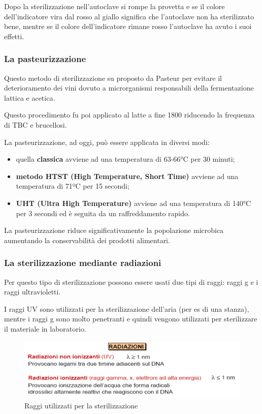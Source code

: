 \documentclass[11pt]{book}
\begin{document}
Dopo la sterilizzazione nell’autoclave si rompe la provetta e se il colore dell'indicatore vira dal rosso al giallo significa che l’autoclave non ha sterilizzato bene, mentre se il colore dell'indicatore rimane rosso l’autoclave ha avuto i suoi effetti.


\subsubsection{La pasteurizzazione} 
Questo metodo di sterilizzazione su proposto da Pasteur per evitare il deterioramento dei vini dovuto a microrganismi responsabili della fermentazione lattica e acetica. 

Questo procedimento fu poi applicato al latte a fine 1800 riducendo la frequenza di TBC e brucellosi.

La pasteurizzazione, ad oggi, può essere applicata in diversi modi:
\begin{itemize}
\item quella \textbf{classica} avviene ad una temperatura di 63-66°C per 30 minuti;
\item \textbf{metodo HTST (High Temperature, Short Time)} avviene ad una temperatura di 71ºC per 15 secondi;
\item \textbf{UHT (Ultra High Temperature)} avviene ad una temperatura di 140°C per 3 secondi ed è seguita da un raffreddamento rapido.
\end{itemize}

La pasteurizzazione riduce significativamente la popolazione microbica aumentando la conservabilità dei prodotti alimentari.

\subsubsection{La sterilizzazione mediante radiazioni}
Per questo tipo di sterilizzazione possono essere usati due tipi di raggi: raggi g e i raggi ultravioletti. 

I raggi UV sono utilizzati per la sterilizzazione dell'aria (per es di una stanza), mentre i raggi g sono molto penetranti e quindi vengono utilizzati per sterilizzare il materiale in laboratorio.

\begin{figure}[htp]
\centering
\includegraphics[scale=0.5]{img/Sterilizzazione tramite radiazioni.png}
\caption{Raggi utilizzati per la sterilizzazione}
\label{}
\end{figure}
\end{document}
